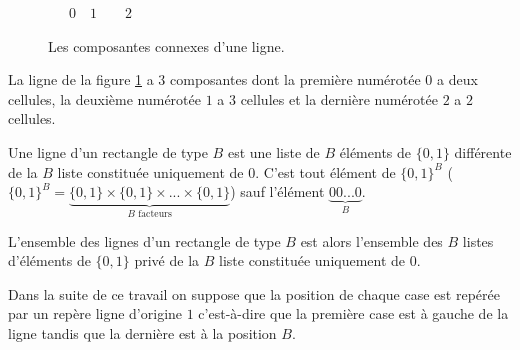 \begin{Ex}\label{ex1}
\begin{figure}[!htb]
\begin{minipage}[c]{.16\linewidth}
        \centering
\end{minipage}
\hfill
\begin{minipage}[c]{.70\linewidth}
        \centering
\begin{logicpuzzle}[rows=1,columns=10,color=cyan!100, width=750px,scale=0.5]
\end{logicpuzzle}
\mbox{ }\mbox{ }\mbox{ }$0$\quad \quad\quad\mbox{ }\mbox{ }$1$\quad \quad\quad\mbox{ }\mbox{ }\mbox{ }\mbox{ }$2$\quad\quad\quad\quad\quad\quad\quad\quad\quad\quad\quad\quad\quad\mbox{ }
\end{minipage}
\caption{\label{Atfig3} Les composantes connexes d'une ligne.}
\end{figure}
La ligne de la figure \ref{Atfig3} a $3$ composantes dont la première numérotée $0$ a deux cellules, la deuxième numérotée $1$ a $3$ cellules et la dernière numérotée $2$ a $2$ cellules.
\end{Ex}
\begin{Def}\label{defAt1}
Une ligne d'un rectangle de type $B$ est  une liste de $B$ éléments de $\{0,1\}$ différente de la $B$ liste constituée uniquement de $0$. C'est tout élément de $\{0,1\}^{B}$ ($\{0,1\}^{B}=\underbrace{\{0,1\}\times\{0,1\}\times...\times \{0,1\}}_{B \text{ facteurs}}$) sauf l'élément $\underbrace{00...0}_{B}.$


L'ensemble des lignes d'un rectangle de type $B$ est alors l'ensemble des $B$ listes d'éléments de $\{0,1\}$ privé de la $B$ liste constituée uniquement de $0$. 
\end{Def}
Dans la suite de ce travail on suppose que la position de chaque case  est repérée par un repère ligne d'origine $1$ c'est-à-dire que la première case est à gauche de la ligne tandis que la dernière est à la position $B$. 


